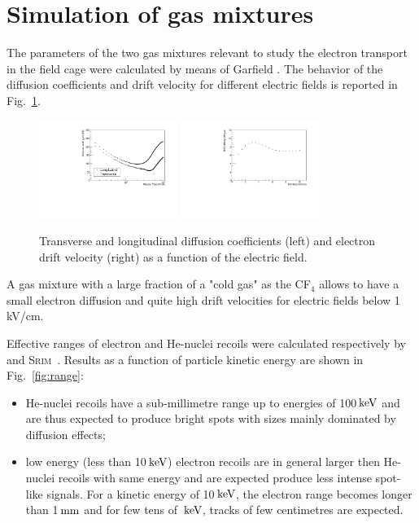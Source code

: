 \documentclass[review]{elsarticle}
\newcommand{\SRIM} {{\textsc{Srim}}\xspace}
\newcommand{\unit}[1]{\ensuremath{\textrm{\,#1}}\xspace}
\newcommand{\keV}{\ensuremath{\,\textrm{ke\hspace{-.08em}V}}\xspace}
\begin{document}
\section{Simulation of gas mixtures}

The parameters of the two gas mixtures relevant to study the electron transport in the field cage were calculated
by means of Garfield \cite{bib:garfield1,bib:garfield2}.
The behavior of the diffusion coefficients and drift velocity for different electric fields is reported in Fig.~\ref{fig:diff_vdrift}.

\begin{figure}[ht]
\centering
\includegraphics[width=0.4\textwidth]{diff6040.pdf}
\includegraphics[width=0.4\textwidth]{vdrift6040.pdf}
\caption{Transverse and longitudinal diffusion coefficients (left) and electron drift velocity (right) as a function of the electric field.}
\label{fig:diff_vdrift}
\end{figure}

 A gas mixture with a large fraction of a "cold gas" as the CF$_4$ allows to have a small electron diffusion and quite high drift velocities for electric fields below 1 kV/cm.
 
 Effective ranges of electron and He-nuclei recoils were calculated
respectively by \GEANTfour~\cite{bib:geant} and
\SRIM~\cite{bib:srim}. Results as a function of particle kinetic
energy are shown in Fig.~\ref{fig:range}:
\begin{itemize}
    \item He-nuclei recoils have a sub-millimetre range up to energies
      of 100\keV and are thus expected to produce bright spots with
      sizes mainly dominated by diffusion effects;
    \item low energy (less than 10\keV) electron recoils are in
      general larger then He-nuclei recoils with same energy and are
      expected produce less intense spot-like signals. For a kinetic
      energy of 10\keV, the electron range becomes longer than
      1\unit{mm} and for few tens of \keV, tracks of few centimetres
      are expected.
\end{itemize}
\end{document}
